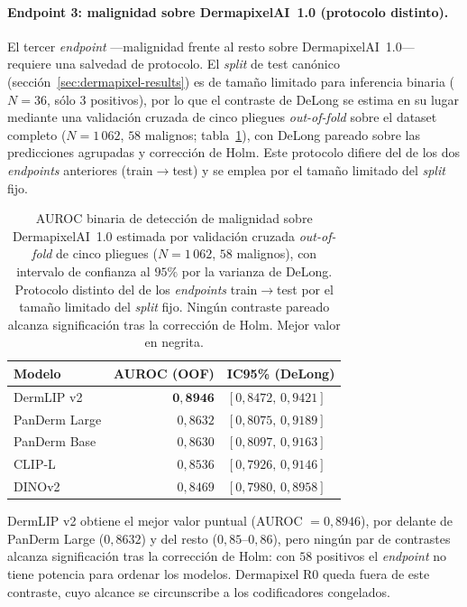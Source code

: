 \paragraph{Endpoint 3: malignidad sobre DermapixelAI~1.0 (protocolo
distinto).} El tercer \emph{endpoint} ---malignidad frente al resto
sobre DermapixelAI~1.0--- requiere una salvedad de protocolo. El
\emph{split} de test canónico (sección~\ref{sec:dermapixel-results}) es
de tamaño limitado para inferencia binaria ($N = 36$, sólo $3$
positivos), por lo que el contraste de DeLong se estima en su lugar
mediante una validación cruzada de cinco pliegues
\emph{out-of-fold} sobre el dataset completo ($N = 1\,062$, $58$
malignos; tabla~\ref{tab:delong-dermapixel}), con DeLong pareado sobre
las predicciones agrupadas y corrección de Holm. Este protocolo difiere del de los dos
\emph{endpoints} anteriores (train$\to$test) y se emplea por el
tamaño limitado del \emph{split} fijo.

\begin{table}[htbp]
\centering
\footnotesize
\setlength{\tabcolsep}{4pt}
\renewcommand{\arraystretch}{0.95}
\caption{AUROC binaria de detección de malignidad sobre DermapixelAI~1.0
estimada por validación cruzada \emph{out-of-fold} de cinco pliegues
($N = 1\,062$, $58$ malignos), con intervalo de confianza al $95\%$ por
la varianza de DeLong. Protocolo distinto del de los \emph{endpoints}
train$\to$test por el tamaño limitado del \emph{split} fijo. Ningún
contraste pareado alcanza significación tras la corrección de Holm.
Mejor valor en negrita.}
\label{tab:delong-dermapixel}
\begin{tabular}{lrl}
\hline
Modelo          & AUROC (OOF)         & IC95\% (DeLong) \\
\hline
DermLIP v2      & $\mathbf{0{,}8946}$ & $[0{,}8472,\, 0{,}9421]$ \\
PanDerm Large   & $0{,}8632$          & $[0{,}8075,\, 0{,}9189]$ \\
PanDerm Base    & $0{,}8630$          & $[0{,}8097,\, 0{,}9163]$ \\
CLIP-L          & $0{,}8536$          & $[0{,}7926,\, 0{,}9146]$ \\
DINOv2          & $0{,}8469$          & $[0{,}7980,\, 0{,}8958]$ \\
\hline
\end{tabular}
\end{table}

DermLIP v2 obtiene el mejor valor puntual (AUROC $= 0{,}8946$), por
delante de PanDerm Large ($0{,}8632$) y del resto ($0{,}85$--$0{,}86$),
pero ningún par de contrastes alcanza significación tras la corrección
de Holm: con $58$ positivos el \emph{endpoint} no tiene potencia para
ordenar los modelos. Dermapixel R0 queda fuera de este contraste, cuyo
alcance se circunscribe a los codificadores congelados.

